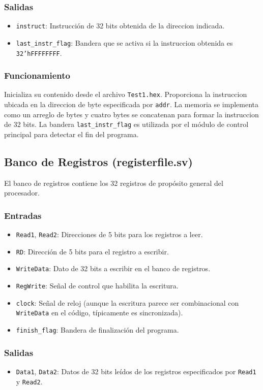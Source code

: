 \documentclass[conference]{IEEEtran}
\begin{document}
\subsubsection{Salidas}
\begin{itemize}
    \item \texttt{instruct}: Instrucción de 32 bits obtenida de la direccion indicada.
    \item \texttt{last\_instr\_flag}: Bandera que se activa si la instruccion obtenida es \texttt{32'hFFFFFFFF}.
\end{itemize}
\subsubsection{Funcionamiento}
Inicializa su contenido desde el archivo \texttt{Test1.hex}. Proporciona la instruccion ubicada en la direccion de byte especificada por \texttt{addr}. La memoria se implementa como un arreglo de bytes y cuatro bytes se concatenan para formar la instruccion de 32 bits. La bandera \texttt{last\_instr\_flag} es utilizada por el módulo de control principal para detectar el fin del programa.

\subsection{Banco de Registros (registerfile.sv)}
El banco de registros contiene los 32 registros de propósito general del procesador.
\subsubsection{Entradas}
\begin{itemize}
    \item \texttt{Read1}, \texttt{Read2}: Direcciones de 5 bits para los registros a leer.
    \item \texttt{RD}: Dirección de 5 bits para el registro a escribir.
    \item \texttt{WriteData}: Dato de 32 bits a escribir en el banco de registros.
    \item \texttt{RegWrite}: Señal de control que habilita la escritura.
    \item \texttt{clock}: Señal de reloj (aunque la escritura parece ser combinacional con \texttt{WriteData} en el código, típicamente es sincronizada).
    \item \texttt{finish\_flag}: Bandera de finalización del programa.
\end{itemize}
\subsubsection{Salidas}
\begin{itemize}
    \item \texttt{Data1}, \texttt{Data2}: Datos de 32 bits leídos de los registros especificados por \texttt{Read1} y \texttt{Read2}.
\end{itemize}
\end{document}
